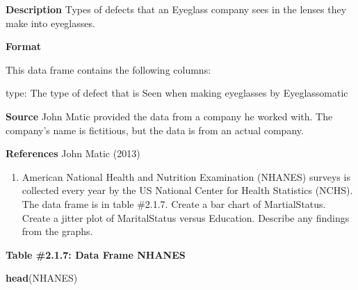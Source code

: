 \documentclass[
]{book}
\newenvironment{Shaded}{\begin{snugshade}}{\end{snugshade}}
\newcommand{\KeywordTok}[1]{\textcolor[rgb]{0.13,0.29,0.53}{\textbf{#1}}}
\newcommand{\NormalTok}[1]{#1}
\providecommand{\tightlist}{%
  \setlength{\itemsep}{0pt}\setlength{\parskip}{0pt}}
\begin{document}
\textbf{Description}
Types of defects that an Eyeglass company sees in the lenses they make into eyeglasses.

\textbf{Format}

This data frame contains the following columns:

type: The type of defect that is Seen when making eyeglasses by Eyeglassomatic

\textbf{Source}
John Matic provided the data from a company he worked with. The company's name is fictitious, but the data is from an actual company.

\textbf{References}
John Matic (2013)

\begin{enumerate}
\def\labelenumi{\arabic{enumi}.}
\setcounter{enumi}{5}
\tightlist
\item
  American National Health and Nutrition Examination (NHANES) surveys is collected every year by the US National Center for Health Statistics (NCHS). The data frame is in table \#2.1.7. Create a bar chart of MartialStatus. Create a jitter plot of MaritalStatus versus Education. Describe any findings from the graphs.
\end{enumerate}

\textbf{Table \#2.1.7: Data Frame NHANES}

\begin{Shaded}
\begin{Highlighting}[]
\KeywordTok{head}\NormalTok{(NHANES)}
\end{Highlighting}
\end{Shaded}
\end{document}
